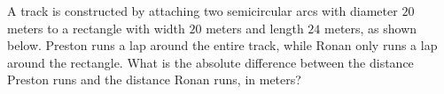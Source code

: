 A track is constructed by attaching two semicircular arcs with diameter $20$ meters to a rectangle with width $20$ meters and length $24$ meters, as shown below. Preston runs a lap around the entire track, while Ronan only runs a lap around the rectangle. What is the absolute difference between the distance Preston runs and the distance Ronan runs, in meters?
